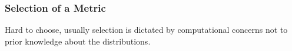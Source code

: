 \begin{multicols}{2}
    \subsubsection{Selection of a Metric}
      Hard to choose, usually selection is dictated by computational concerns not to prior knowledge
      about the distributions.
      
      
  \end{multicols}